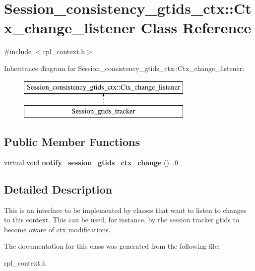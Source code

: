 \hypertarget{classSession__consistency__gtids__ctx_1_1Ctx__change__listener}{}\section{Session\+\_\+consistency\+\_\+gtids\+\_\+ctx\+:\+:Ctx\+\_\+change\+\_\+listener Class Reference}
\label{classSession__consistency__gtids__ctx_1_1Ctx__change__listener}


{\ttfamily \#include $<$rpl\+\_\+context.\+h$>$}

Inheritance diagram for Session\+\_\+consistency\+\_\+gtids\+\_\+ctx\+:\+:Ctx\+\_\+change\+\_\+listener\+:\begin{figure}[H]
\begin{center}
\leavevmode
\includegraphics[height=2.000000cm]{classSession__consistency__gtids__ctx_1_1Ctx__change__listener}
\end{center}
\end{figure}
\subsection*{Public Member Functions}
\begin{DoxyCompactItemize}
\item 
\mbox{\label{classSession__consistency__gtids__ctx_1_1Ctx__change__listener_ae622b04230898702168d32dd878f917e}} 
virtual void {\bfseries notify\+\_\+session\+\_\+gtids\+\_\+ctx\+\_\+change} ()=0
\end{DoxyCompactItemize}


\subsection{Detailed Description}
This is an interface to be implemented by classes that want to listen to changes to this context. This can be used, for instance, by the session tracker gtids to become aware of ctx modifications. 

The documentation for this class was generated from the following file\+:\begin{DoxyCompactItemize}
\item 
rpl\+\_\+context.\+h\end{DoxyCompactItemize}
